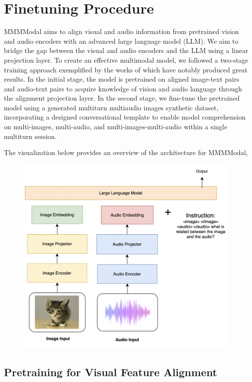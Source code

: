 \documentclass[preprint]{article}
\begin{document}
\section{Finetuning Procedure}

MMMModal aims to align visual and audio information from pretrained vision and audio encoders with an advanced large language model (LLM). We aim to bridge the gap between the visual and audio encoders and the LLM using a linear projection layer. To create an effective multimodal model, we followed a two-stage training approach exemplified by the works of \cite{han2023chartllama,zhu2023minigpt4,liu2024hidden} which have notably produced great results. In the initial stage, the model is pretrained on aligned image-text pairs and audio-text pairs to acquire knowledge of vision and audio language through the alignment projection layer. In the second stage, we fine-tune the pretrained model using a generated multiturn multiaudio images synthetic dataset, incorporating a designed conversational template to enable model comprehension on multi-images, multi-audio, and multi-images-multi-audio within a single multiturn session.

The visualization below provides an overview of the architecture for MMMModal,

\begin{figure}[hbt!]
  \centering
  \includegraphics[width=0.6\linewidth]{pic/overall-architecture.png} %
\end{figure}

\subsection{Pretraining for Visual Feature Alignment}
\end{document}
